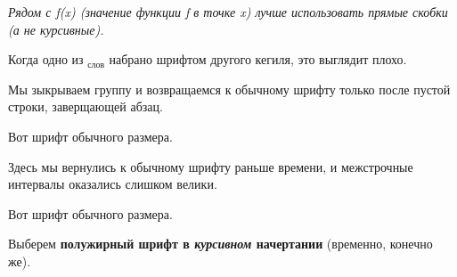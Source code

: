 \documentclass[12pt]{article}
\begin{document}
\begin{center}
\textit{Рядом с f\textup{(}x\textup{)} \textup{(}значение функции f в точке x\textup{)} лучше использовать прямые скобки (а не курсивные).}
\end{center}

\begin{center}
Когда одно из $_\text{слов}$ набрано шрифтом другого кегиля, это выглядит плохо.
\end{center}

\begin{center}
Мы зыкрываем группу и возвращаемся к обычному шрифту только после пустой строки, заверщающей абзац.

Вот шрифт обычного размера.

Здесь мы вернулись к обычному шрифту раньше времени, и межстрочные интервалы оказались слишком велики.

Вот шрифт обычного размера.
\end{center}

\begin{center}
Выберем \textbf{полужирный шрифт в \textit{курсивном} начертании} (временно, конечно же).
\end{center}
\end{document}
